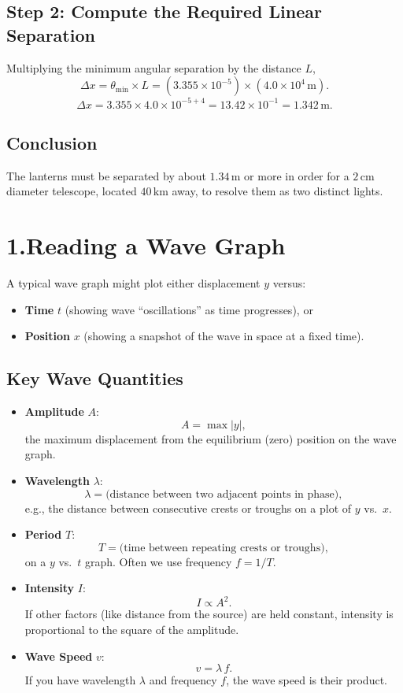 \documentclass[12pt]{article}
\theoremstyle{definition} %
\theoremstyle{plain} %
\begin{document}
\subsection*{Step 2: Compute the Required Linear Separation}

Multiplying the minimum angular separation by the distance \( L \),
\[
   \Delta x
   = \theta_\mathrm{min} \times L
   = \left(3.355 \times 10^{-5}\right)
     \times \left(4.0 \times 10^4\,\mathrm{m}\right).
\]
\[
   \Delta x 
   = 3.355 \times 4.0 \times 10^{-5 + 4}
   = 13.42 \times 10^{-1}
   = 1.342\,\mathrm{m}.
\]

\subsection*{Conclusion}

The lanterns must be separated by about \(\boxed{1.34\,\mathrm{m}}\) or more 
in order for a \(2\,\mathrm{cm}\) diameter telescope, located \(40\,\mathrm{km}\) away, 
to resolve them as two distinct lights.


\section*{1.\;Reading a Wave Graph}
A typical wave graph might plot either displacement $y$ versus:
\begin{itemize}
  \item \textbf{Time} $t$ (showing wave ``oscillations'' as time progresses), or
  \item \textbf{Position} $x$ (showing a snapshot of the wave in space at a fixed time).
\end{itemize}

\subsection*{Key Wave Quantities}
\begin{itemize}
  \item \textbf{Amplitude} $A$:
    \[
      A = \max |y|,
    \]
    the maximum displacement from the equilibrium (zero) position on the wave graph.
    
  \item \textbf{Wavelength} $\lambda$:
    \[
      \lambda = \text{(distance between two adjacent points in phase)},
    \]
    e.g., the distance between consecutive crests or troughs on a plot of $y$ vs.\ $x$.
    
  \item \textbf{Period} $T$:
    \[
      T = \text{(time between repeating crests or troughs)},
    \]
    on a $y$ vs.\ $t$ graph.  Often we use frequency $f = 1/T$.
    
  \item \textbf{Intensity} $I$:
    \[
      I \propto A^2.
    \]
    If other factors (like distance from the source) are held constant, intensity is proportional
    to the square of the amplitude.
    
  \item \textbf{Wave Speed} $v$:
    \[
      v = \lambda\,f.
    \]
    If you have wavelength $\lambda$ and frequency $f$, the wave speed is their product.
\end{itemize}
\end{document}
